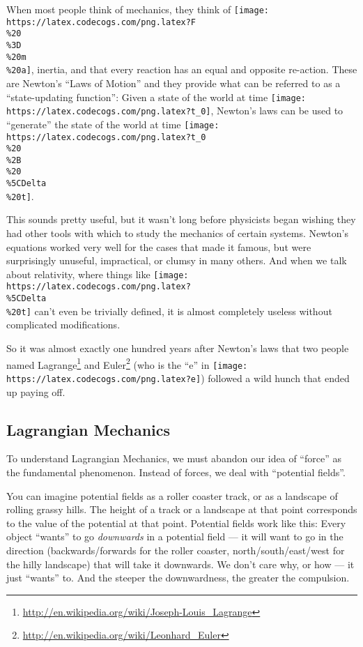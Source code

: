 \documentclass[]{article}
\renewcommand{\href}[2]{#2\footnote{\url{#1}}}
\begin{document}
When most people think of mechanics, they think of
\texttt{[image: https://latex.codecogs.com/png.latex?F\\\%20\\\%3D\\\%20m\\\%20a]},
inertia, and that every reaction has an equal and opposite re-action. These are
Newton's ``Laws of Motion'' and they provide what can be referred to as a
``state-updating function'': Given a state of the world at time
\texttt{[image: https://latex.codecogs.com/png.latex?t\_0]}, Newton's laws can be
used to ``generate'' the state of the world at time
\texttt{[image: https://latex.codecogs.com/png.latex?t\_0\\\%20\\\%2B\\\%20\\\%5CDelta\\\%20t]}.

This sounds pretty useful, but it wasn't long before physicists began wishing
they had other tools with which to study the mechanics of certain systems.
Newton's equations worked very well for the cases that made it famous, but were
surprisingly unuseful, impractical, or clumsy in many others. And when we talk
about relativity, where things like
\texttt{[image: https://latex.codecogs.com/png.latex?\\\%5CDelta\\\%20t]} can't even
be trivially defined, it is almost completely useless without complicated
modifications.

So it was almost exactly one hundred years after Newton's laws that two people
named \href{http://en.wikipedia.org/wiki/Joseph-Louis_Lagrange}{Lagrange} and
\href{http://en.wikipedia.org/wiki/Leonhard_Euler}{Euler} (who is the ``e'' in
\texttt{[image: https://latex.codecogs.com/png.latex?e]}) followed a wild hunch
that ended up paying off.

\subsection{Lagrangian Mechanics}\label{lagrangian-mechanics}

To understand Lagrangian Mechanics, we must abandon our idea of ``force'' as the
fundamental phenomenon. Instead of forces, we deal with ``potential fields''.

You can imagine potential fields as a roller coaster track, or as a landscape of
rolling grassy hills. The height of a track or a landscape at that point
corresponds to the value of the potential at that point. Potential fields work
like this: Every object ``wants'' to go \emph{downwards} in a potential field
--- it will want to go in the direction (backwards/forwards for the roller
coaster, north/south/east/west for the hilly landscape) that will take it
downwards. We don't care why, or how --- it just ``wants'' to. And the steeper
the downwardness, the greater the compulsion.
\end{document}
